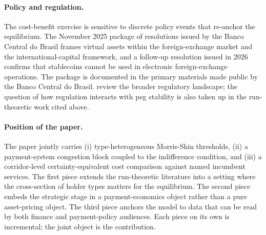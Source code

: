 \paragraph{Policy and regulation.} The cost-benefit exercise is sensitive to discrete policy events that re-anchor the equilibrium. The November 2025 package of resolutions issued by the Banco Central do Brasil frames virtual assets within the foreign-exchange market and the international-capital framework, and a follow-up resolution issued in 2026 confirms that stablecoins cannot be used in electronic foreign-exchange operations. The package is documented in the primary materials made public by the Banco Central do Brasil. \citet{arner_auer_frost_2020} review the broader regulatory landscape; the question of how regulation interacts with peg stability is also taken up in the run-theoretic work cited above.

\paragraph{Position of the paper.} The paper jointly carries (i) type-heterogeneous Morris-Shin thresholds, (ii) a payment-system congestion block coupled to the indifference condition, and (iii) a corridor-level certainty-equivalent cost comparison against named incumbent services. The first piece extends the run-theoretic literature into a setting where the cross-section of holder types matters for the equilibrium. The second piece embeds the strategic stage in a payment-economics object rather than a pure asset-pricing object. The third piece anchors the model to data that can be read by both finance and payment-policy audiences. Each piece on its own is incremental; the joint object is the contribution.
